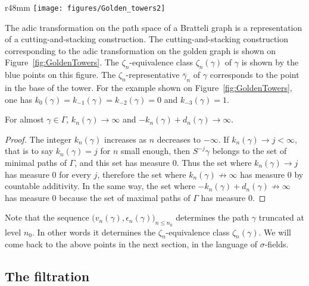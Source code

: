 \documentclass[12pt,a4paper]{article}
\begin{document}
\begin{wrapfigure}{r}{48mm}
   \centering
   	\texttt{[image: figures/Golden\_towers2]}
   \caption{Golden towers}
   \label{fig:GoldenTowers}
\end{wrapfigure}
The adic transformation on the path space of a Bratteli graph is 
a representation of a cutting-and-stacking construction. 
The cutting-and-stacking construction corresponding to 
the adic transformation on the golden graph is shown on
Figure~\ref{fig:GoldenTowers}. 
The $\zeta_n$-equivalence class $\zeta_n(\gamma)$ of 
$\gamma$ is shown by the blue points on this figure. 
The $\zeta_n$-representative $\bar\gamma_n$ of $\gamma$ 
corresponds to the point in the base of the tower. 
For the example shown on Figure~\ref{fig:GoldenTowers}, 
one has $k_0(\gamma)=k_{-1}(\gamma)=k_{-2}(\gamma)=0$ 
and $k_{-3}(\gamma)=1$. 




\begin{lemma}\label{lemma:infinitelimits}
For almost $\gamma \in \Gamma$, 
$k_n(\gamma) \to \infty$ and $-k_n(\gamma)+d_n(\gamma) \to \infty$.
\end{lemma}

\begin{proof}
The integer $k_n(\gamma)$ increases as $n$ decreases to $-\infty$. 
If $k_n(\gamma) \to j < \infty$, that is to say $k_n(\gamma)=j$ for $n$ small 
enough, then $S^{-j}\gamma$ belongs to the set of minimal paths 
of $\Gamma$, and this set has measure $0$. 
Thus the set where $k_n(\gamma) \to j$ has measure $0$ for every $j$, 
therefore the set where $k_n(\gamma) \not\to \infty$ has measure $0$ 
by countable additivity. 
In the same way, the set where $-k_n(\gamma)+d_n(\gamma) \not\to \infty$ 
has measure $0$ because the set of maximal paths of $\Gamma$ has measure $0$.
\end{proof}

 
Note that the sequence $\bigl(v_n(\gamma), \epsilon_n(\gamma)\bigr)_{n \leq n_0}$  
 determines the path $\gamma$ truncated at level $n_0$. 
In other words it determines the $\zeta_{n}$-equivalence class  
$\zeta_n(\gamma)$. 
We will come back to the above points in the next section, in the 
language of $\sigma$-fields. 



\subsection{The filtration}
\end{document}

